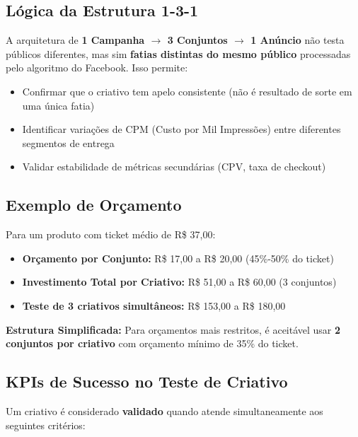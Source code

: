 \documentclass[12pt, a4paper]{article}
\newcommand{\reais}[1]{R\$ #1}
\begin{document}
\subsection{Lógica da Estrutura 1-3-1}

A arquitetura de \textbf{1 Campanha $\rightarrow$ 3 Conjuntos $\rightarrow$ 1 Anúncio} não testa públicos diferentes, mas sim \textbf{fatias distintas do mesmo público} processadas pelo algoritmo do Facebook. Isso permite:

\begin{itemize}
    \item Confirmar que o criativo tem apelo consistente (não é resultado de sorte em uma única fatia)
    \item Identificar variações de CPM (Custo por Mil Impressões) entre diferentes segmentos de entrega
    \item Validar estabilidade de métricas secundárias (CPV, taxa de checkout)
\end{itemize}

\subsection{Exemplo de Orçamento}

Para um produto com ticket médio de \reais{37,00}:

\begin{itemize}
    \item \textbf{Orçamento por Conjunto:} \reais{17,00} a \reais{20,00} (45\%-50\% do ticket)
    \item \textbf{Investimento Total por Criativo:} \reais{51,00} a \reais{60,00} (3 conjuntos)
    \item \textbf{Teste de 3 criativos simultâneos:} \reais{153,00} a \reais{180,00}
\end{itemize}

\textcolor{warningOrange}{\textbf{Estrutura Simplificada:}} Para orçamentos mais restritos, é aceitável usar \textbf{2 conjuntos por criativo} com orçamento mínimo de 35\% do ticket.

\needspace{10cm}

\subsection{KPIs de Sucesso no Teste de Criativo}

Um criativo é considerado \textbf{validado} quando atende simultaneamente aos seguintes critérios:
\end{document}
